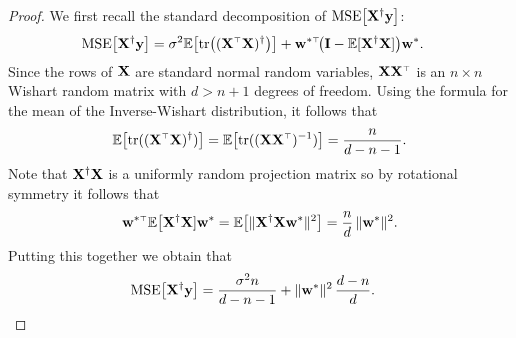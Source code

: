 \begin{proof}
  We first recall the standard decomposition of ${\mathrm{MSE}\big[\mathbf X^\dagger \mathbf y\big]}$:
  \begin{align*}
    \MSE{\X^\dagger \y}
    &=\sigma^2 \E\big[\tr\big((\X^\top \X)^\dagger \big)\big]+
      \w^{*\top}\!\big( \I - \E[\X^\dagger \X]\big) \w^*.
  \end{align*}
  Since the rows of $\mathbf X$ are standard normal random variables,
  $\X\X^\top$ is an $n\times n$ Wishart random matrix with $d>n+1$ degrees
  of freedom. Using the formula for the mean of the Inverse-Wishart
  distribution, it follows that
  \begin{align*}
\E\big[\tr((\X^\top\X)^\dagger)\big] = \E\big[\tr((\X\X^\top)^{-1})\big]= \frac{n}{d - n - 1}.
  \end{align*}
Note that $\mathbf X^\dagger\mathbf X$ is a uniformly random projection matrix so by
rotational symmetry it follows that
\begin{align*}
  \w^{*\top}\E\big[\X^\dagger\X]\w^* =
  \E\big[\|\X^\dagger\X\w^*\|^2\big] = \frac nd \,\|\w^*\|^2.
\end{align*}
Putting this together we obtain that
  \begin{align*}
    {\mathrm{MSE}\big[\mathbf X^\dagger \mathbf y\big]}
    &=\frac{\sigma^2 n}{d - n - 1}+ \|\mathbf w^*\|^2\,\frac{d - n}{d}.
  \end{align*}

\end{proof}
